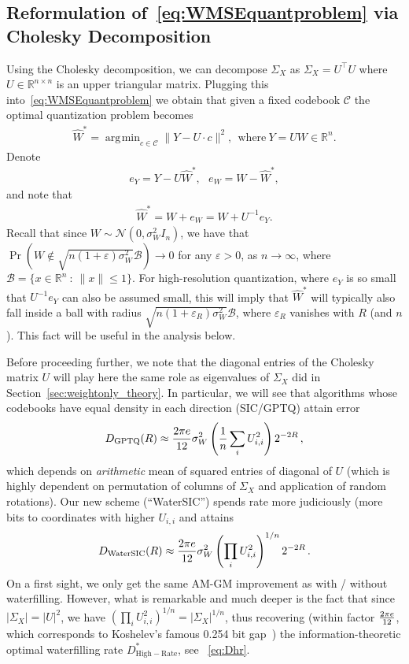\documentclass[journal]{IEEEtran}
\newcommand{\RR}{\mathbb{R}}
\newcommand{\eps}{\varepsilon}
\newcommand{\m}{\mathcal}
\newcommand{\HR}{\mathrm{High-Rate}}
\DeclareMathOperator*{\argmin}{\arg\!\min}
\begin{document}
\subsection{Reformulation of~\eqref{eq:WMSEquantproblem} via Cholesky Decomposition}
\label{subsec:cholseky}

Using the Cholesky decomposition, we can decompose $\Sigma_X$ as $\Sigma_X=U^\top U$ where $U\in\RR^{n\times n}$ is an upper triangular matrix. Plugging this into~\eqref{eq:WMSEquantproblem} we obtain that given a fixed codebook $\m{C}$ the optimal quantization problem becomes
\begin{align}
\hat{W}^*=\argmin_{c\in\m{C}}\|Y-U\cdot c\|^2,~~\text{where}~Y=UW\in\RR^n. 
\label{eq:LatDecEq}
\end{align}
Denote
\begin{align}
e_Y=Y-U\hat{W}^*,~~~e_W=W-\hat{W}^*,    
\end{align}
and note that
\begin{align}
\hat{W}^*=W+e_W=W+U^{-1}e_Y.    
\end{align}
Recall that since $W\sim\m{N}(0,\sigma^2_W I_n)$, we have that $\Pr(W\notin
\sqrt{n(1+\eps)\sigma_W^2}\m{B})\to 0$ for any $\eps>0$, as $n\to\infty$, where
$\m{B}=\{x\in\RR^n~:~\|x\|\leq 1\}$. For high-resolution quantization, where $e_Y$ is so
small that $U^{-1} e_Y$ can also be assumed small, this will imply that $\hat{W}^*$ will
typically also fall inside a ball with radius $\sqrt{n(1+\eps_R)\sigma_W^2}\m{B}$, where
$\eps_R$ vanishes with $R$ (and $n$).  This fact will be useful in the analysis below.


Before proceeding further, we note that the diagonal entries of the Cholesky matrix $U$  will play here the
same role as eigenvalues of $\Sigma_X$ did in Section~\ref{sec:weightonly_theory}. In particular,
we will see that algorithms whose codebooks have equal density in each direction (SIC/GPTQ) attain error
	\begin{equation}\label{eq:dsic_final}
		D_{\mathrm{GPTQ}}(R) \approx {2\pi e\over 12} \sigma_W^2 \left({1\over n} \sum_i U_{i,i}^2\right) 2^{-2R}\,,
\end{equation}	
which depends on \textit{arithmetic} mean of squared entries of diagonal of $U$ (which
is highly dependent on permutation of columns of $\Sigma_X$ and application of random rotations).
Our new scheme (``WaterSIC'') spends rate more judiciously (more bits to coordinates with higher
$U_{i,i}$ and attains 
	\begin{equation}\label{eq:dwatersic_final}
		D_{\mathrm{WaterSIC}}(R) \approx {2\pi e\over 12} \sigma_W^2 \left(\prod_i U_{i,i}^2\right)^{1/n}
	2^{-2R}\,.
\end{equation}	
On a first sight, we only get the same AM-GM improvement as with / without waterfilling. However,
what is remarkable and much deeper is the fact that since $|\Sigma_X| = |U|^2$, we have $(\prod_i
U_{i,i}^2)^{1/n} = |\Sigma_X|^{1/n}$, thus recovering (within factor ${2\pi e\over 12}$, which
corresponds to Koshelev's famous 0.254 bit gap~\cite[Section 24.1.5]{PWbook24}) the
information-theoretic optimal waterfilling rate $D^*_{\HR}$, see ~\eqref{eq:Dhr}.
    
\end{document}
